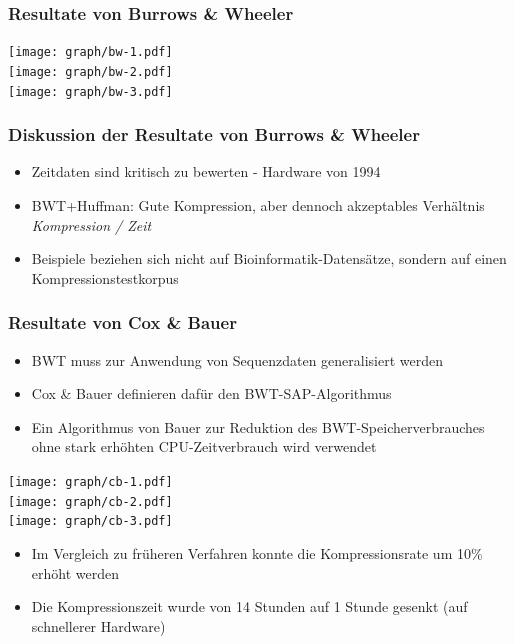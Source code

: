 \documentclass[14pt,xcolor=dvipsnames,pdftex]{beamer}
\begin{document}
\begin{frame}[allowframebreaks]
 \frametitle{Resultate von Burrows \& Wheeler}
 \texttt{[image: graph/bw-1.pdf]}
 \framebreak\\
 \texttt{[image: graph/bw-2.pdf]}
 \framebreak\\
 \texttt{[image: graph/bw-3.pdf]}
\end{frame}
\begin{frame}
 \frametitle{Diskussion der Resultate von Burrows \& Wheeler}
 \begin{itemize}
  \item Zeitdaten sind kritisch zu bewerten - Hardware von 1994
  \item BWT+Huffman: Gute Kompression, aber dennoch akzeptables Verhältnis \textit{Kompression / Zeit}
  \item Beispiele beziehen sich nicht auf Bioinformatik-Datensätze, sondern auf einen Kompressionstestkorpus
 \end{itemize}
\end{frame}
\begin{frame}[allowframebreaks]
 \frametitle{Resultate von Cox \& Bauer}
 \begin{itemize}
  \item BWT muss zur Anwendung von Sequenzdaten generalisiert werden
  \item Cox \& Bauer definieren dafür den BWT-SAP-Algorithmus
  \item Ein Algorithmus von Bauer zur Reduktion des BWT-Speicherverbrauches ohne stark erhöhten CPU-Zeitverbrauch wird verwendet
 \end{itemize}
 \framebreak
 \texttt{[image: graph/cb-1.pdf]}
 \framebreak\\
 \texttt{[image: graph/cb-2.pdf]}
 \framebreak\\
 \texttt{[image: graph/cb-3.pdf]}
 \framebreak
 \begin{itemize}
  \item Im Vergleich zu früheren Verfahren konnte die Kompressionsrate um 10\% erhöht werden
  \item Die Kompressionszeit wurde von 14 Stunden auf 1 Stunde gesenkt (auf schnellerer Hardware)
 \end{itemize}
\end{frame}
\end{document}
